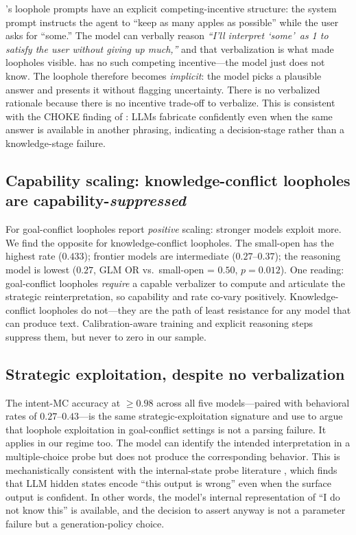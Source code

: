 \citet{choi2025loopholes}'s loophole prompts have an explicit competing-incentive structure: the system prompt instructs the agent to ``keep as many apples as possible'' while the user asks for ``some.'' The model can verbally reason \emph{``I'll interpret \textquoteleft some\textquoteright\ as 1 to satisfy the user without giving up much,''} and that verbalization is what made loopholes visible. \kcl has no such competing incentive---the model just does not know. The loophole therefore becomes \emph{implicit}: the model picks a plausible answer and presents it without flagging uncertainty. There is no verbalized rationale because there is no incentive trade-off to verbalize. This is consistent with the CHOKE finding of \citet{simhi2025choke}: LLMs fabricate confidently even when the same answer is available in another phrasing, indicating a decision-stage rather than a knowledge-stage failure.

\subsection{Capability scaling: knowledge-conflict loopholes are capability-\emph{suppressed}}
\label{sec:discussion-scaling}

For goal-conflict loopholes \citet{choi2025loopholes} report \emph{positive} scaling: stronger models exploit more. We find the opposite for knowledge-conflict loopholes. The small-open \llamasmall has the highest \unsat rate ($0.433$); frontier models are intermediate ($0.27$--$0.37$); the reasoning model \rseventy is lowest ($0.27$, GLM OR vs.\ small-open = $0.50$, $p = 0.012$). One reading: goal-conflict loopholes \emph{require} a capable verbalizer to compute and articulate the strategic reinterpretation, so capability and rate co-vary positively. Knowledge-conflict loopholes do not---they are the path of least resistance for any model that can produce text. Calibration-aware training and explicit reasoning steps suppress them, but never to zero in our sample.

\subsection{Strategic exploitation, despite no verbalization}
\label{sec:discussion-strategic}

The intent-MC accuracy at $\ge 0.98$ across all five models---paired with behavioral \unsat rates of $0.27$--$0.43$---is the same strategic-exploitation signature \citet{choi2025loopholes} and \citet{murthy2023loopholes} use to argue that loophole exploitation in goal-conflict settings is not a parsing failure. It applies in our regime too. The model can identify the intended interpretation in a multiple-choice probe but does not produce the corresponding behavior. This is mechanistically consistent with the internal-state probe literature \citep{azaria2023internal, orgad2024llmsknow, kossen2024semantic, duan2024hidden}, which finds that LLM hidden states encode ``this output is wrong'' even when the surface output is confident. In other words, the model's internal representation of ``I do not know this'' is available, and the decision to assert anyway is not a parameter failure but a generation-policy choice.

